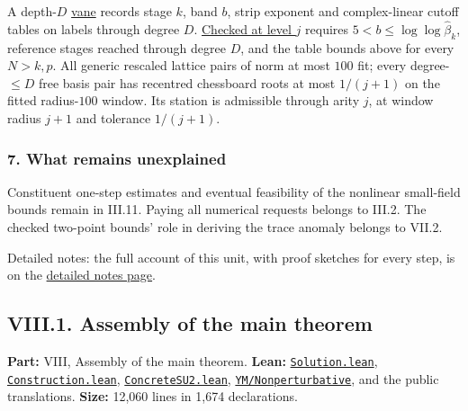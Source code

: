 \documentclass[
  letterpaper,
  11pt]{article}
\begin{document}
A depth-\(D\)
\href{https://github.com/yang-mills-group/OpenAI-YM-20261028/blob/3456e5e75cf8d4cd558955a5c7638fba2d68f464/YM/TraceExtension/Prom/Zoom/Boats.lean\#L65-L69}{vane}
records stage \(k\), band \(b\), strip exponent and complex-linear
cutoff tables on labels through degree \(D\).
\href{https://github.com/yang-mills-group/OpenAI-YM-20261028/blob/3456e5e75cf8d4cd558955a5c7638fba2d68f464/YM/TraceExtension/Prom/Zoom/Boats.lean\#L42-L47}{Checked
at level \(j\)} requires \(5<b\le\log\log\hat\beta_k\), reference stages
reached through degree \(D\), and the table bounds above for every
\(N>k,p\). All generic rescaled lattice pairs of norm at most \(100\)
fit; every degree-\(\le D\) free basis pair has recentred chessboard
roots at most \(1/(j+1)\) on the fitted radius-\(100\) window. Its
station is admissible through arity \(j\), at window radius \(j+1\) and
tolerance \(1/(j+1)\).

\subsubsection{7. What remains
unexplained}\label{what-remains-unexplained-30}

Constituent one-step estimates and eventual feasibility of the nonlinear
small-field bounds remain in III.11. Paying all numerical requests
belongs to III.2. The checked two-point bounds' role in deriving the
trace anomaly belongs to VII.2.

Detailed notes: the full account of this unit, with proof sketches for
every step, is on the
\href{https://github.com/scottnarmstrong/yang-mills-informalization/blob/main/outline/notes/VII-6.md}{detailed
notes page}.

\subsection{VIII.1. Assembly of the main
theorem}\label{viii.1.-assembly-of-the-main-theorem}

\textbf{Part:} VIII, Assembly of the main theorem. \textbf{Lean:}
\href{https://github.com/yang-mills-group/OpenAI-YM-20261028/blob/3456e5e75cf8d4cd558955a5c7638fba2d68f464/Solution.lean}{\texttt{Solution.lean}},
\href{https://github.com/yang-mills-group/OpenAI-YM-20261028/blob/3456e5e75cf8d4cd558955a5c7638fba2d68f464/Construction.lean}{\texttt{Construction.lean}},
\href{https://github.com/yang-mills-group/OpenAI-YM-20261028/blob/3456e5e75cf8d4cd558955a5c7638fba2d68f464/ConcreteSU2.lean}{\texttt{ConcreteSU2.lean}},
\href{https://github.com/yang-mills-group/OpenAI-YM-20261028/tree/3456e5e75cf8d4cd558955a5c7638fba2d68f464/YM/Nonperturbative}{\texttt{YM/Nonperturbative}},
and the public translations. \textbf{Size:} 12,060 lines in 1,674
declarations.
\end{document}

